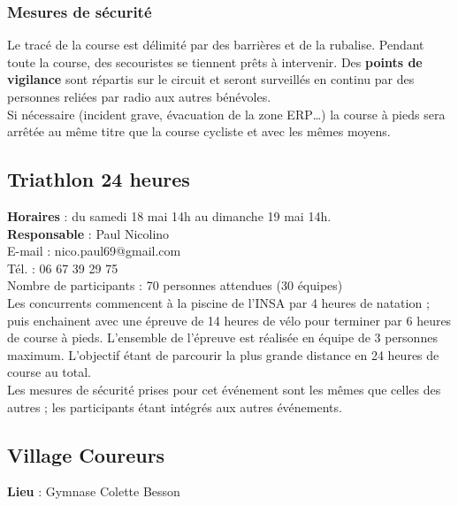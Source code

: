 \documentclass[hidelinks, paper=a4, fontsize=13pt]{report}
\begin{document}
\subsubsection{Mesures de sécurité}



Le tracé de la course est délimité par des barrières et de la rubalise. Pendant toute la course, des secouristes se tiennent prêts à intervenir. 
Des \textbf{points de vigilance} sont répartis sur le circuit et seront surveillés en continu par des personnes reliées par radio aux autres bénévoles.\\

Si nécessaire (incident grave, évacuation de la zone ERP…) la course à pieds sera arrêtée au même titre que la course cycliste et avec les mêmes moyens. 

\subsection{Triathlon 24 heures}

\textbf{Horaires} : du samedi 18 mai 14h au dimanche 19 mai 14h.\\

\textbf{Responsable} : Paul Nicolino\\
	E-mail : nico.paul69@gmail.com\\
	Tél. : 06 67 39 29 75\\

Nombre de participants : 70 personnes attendues (30 équipes)\\

Les concurrents commencent à la piscine de l’INSA par 4 heures de natation ; puis enchainent avec une épreuve de 14 heures de vélo pour terminer par 6 heures de course à pieds. L'ensemble de l'épreuve est réalisée en équipe de 3 personnes maximum. L’objectif étant de parcourir la plus grande distance en 24 heures de course au total.\\

Les mesures de sécurité prises pour cet événement sont les mêmes que celles des autres ; les participants étant intégrés aux autres événements.\\

\subsection{Village Coureurs}

\textbf{Lieu} : Gymnase Colette Besson\\
\end{document}
